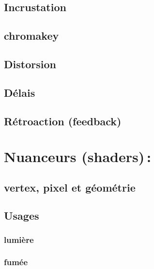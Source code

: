\documentclass[
]{book}
\begin{document}
\hypertarget{incrustation}{%
\subsection{Incrustation}\label{incrustation}}

\hypertarget{chromakey}{%
\subsection{chromakey}\label{chromakey}}

\hypertarget{distorsion}{%
\subsection{Distorsion}\label{distorsion}}

\hypertarget{duxe9lais}{%
\subsection{Délais}\label{duxe9lais}}

\hypertarget{ruxe9troaction-feedback}{%
\subsection{Rétroaction (feedback)}\label{ruxe9troaction-feedback}}

\hypertarget{nuanceurs-shaders}{%
\section{Nuanceurs (shaders)\,:}\label{nuanceurs-shaders}}

\hypertarget{vertex-pixel-et-guxe9omuxe9trie}{%
\subsection{vertex, pixel et géométrie}\label{vertex-pixel-et-guxe9omuxe9trie}}

\hypertarget{usages}{%
\subsection{Usages}\label{usages}}

\hypertarget{lumiuxe8re}{%
\subsubsection{lumière}\label{lumiuxe8re}}

\hypertarget{fumuxe9e}{%
\subsubsection{fumée}\label{fumuxe9e}}
\end{document}

